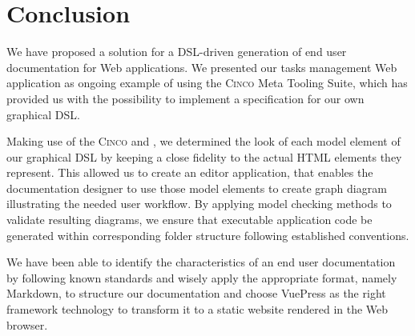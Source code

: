 \chapter{Conclusion}\label{ch:concl}

We have proposed a solution for a DSL-driven generation of end user documentation for Web applications. We presented our tasks management Web application as ongoing example of  using the \textsc{Cinco} Meta Tooling Suite, which has provided us with the possibility to implement a specification for our own graphical DSL.

Making use of the \textsc{Cinco}  and , we determined the look of each model element of our graphical DSL by keeping a close fidelity to the actual HTML elements they represent. This allowed us to create an editor application, that enables the documentation designer to use those model elements to create graph diagram illustrating the needed user workflow. By applying model checking methods to validate resulting diagrams, we ensure that executable application code be generated within corresponding folder structure following established conventions.

We have been able to identify the characteristics of an end user documentation by following known standards and wisely apply the appropriate format, namely Markdown, to structure our documentation and choose VuePress as the right framework technology to transform it to a static website rendered in the Web browser.